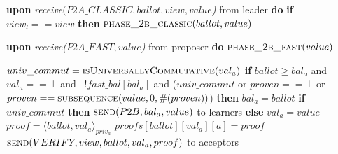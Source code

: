 \begin{algorithm}
\begin{algorithmic}[1]
		\State
		\State \textbf{upon} \textit{receive$(P2A\_CLASSIC, ballot, view, value$)} from leader \textbf{do}
		\State \hspace{\algorithmicindent} \textbf{if} $view_l == view$ \textbf{then}
		\State \hspace{\algorithmicindent}\hspace{\algorithmicindent} $\Call{phase\_2b\_classic}{ballot, value}$
		
		\State		
		\State \textbf{upon} \textit{receive($P2A\_FAST, value$)} from proposer \textbf{do}
		\State \hspace{\algorithmicindent} $\Call{phase\_2b\_fast}{value}$
	
		\State
		\State $univ\_commut = \Call{isUniversallyCommutative}{val_a}$
		\State \textbf{if} $ballot \geq bal_a$ and $val_a ==  \bot$ and \ $!fast\_bal[bal_a]$ and ($univ\_commut$ or $proven == \bot$ or $proven == \Call{subsequence}{value, 0, \#(proven)}$) \textbf{then}
		\State \hspace{\algorithmicindent} $bal_a = ballot$
		\State \hspace{\algorithmicindent} \textbf{if} $univ\_commut$ \textbf{then}
		\State \hspace{\algorithmicindent}\hspace{\algorithmicindent} $\Call{send}{P2B,bal_a, value}$ to learners
		\State \hspace{\algorithmicindent} \textbf{else} 
		\State \hspace{\algorithmicindent}\hspace{\algorithmicindent} $val_a = value$
		\State \hspace{\algorithmicindent}\hspace{\algorithmicindent} $proof = \langle ballot, val_a \rangle_{priv_a}$
		\State \hspace{\algorithmicindent}\hspace{\algorithmicindent} $proofs[ballot][val_a][a] = proof$
		\State \hspace{\algorithmicindent}\hspace{\algorithmicindent} $\Call{send}{VERIFY, view, ballot, val_a, proof}$ to acceptors
		\EndFunction
		

\end{algorithmic}
\end{algorithm}
